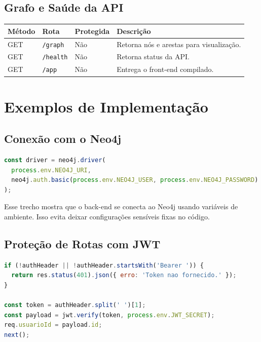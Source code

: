 \documentclass[12pt,a4paper]{article}
\begin{document}
\subsection{Grafo e Saúde da API}

\begin{table}[H]
\centering
\begin{tabular}{p{2cm}p{4.5cm}p{2cm}p{5cm}}
\toprule
\textbf{Método} & \textbf{Rota} & \textbf{Protegida} & \textbf{Descrição}\\
\midrule
GET & \texttt{/graph} & Não & Retorna nós e arestas para visualização.\\
GET & \texttt{/health} & Não & Retorna status da API.\\
GET & \texttt{/app} & Não & Entrega o front-end compilado.\\
\bottomrule
\end{tabular}
\end{table}

\section{Exemplos de Implementação}

\subsection{Conexão com o Neo4j}

\begin{lstlisting}[language=JavaScript]
const driver = neo4j.driver(
  process.env.NEO4J_URI,
  neo4j.auth.basic(process.env.NEO4J_USER, process.env.NEO4J_PASSWORD)
);
\end{lstlisting}

Esse trecho mostra que o back-end se conecta ao Neo4j usando variáveis de ambiente. Isso evita deixar configurações sensíveis fixas no código.

\subsection{Proteção de Rotas com JWT}

\begin{lstlisting}[language=JavaScript]
if (!authHeader || !authHeader.startsWith('Bearer ')) {
  return res.status(401).json({ erro: 'Token nao fornecido.' });
}

const token = authHeader.split(' ')[1];
const payload = jwt.verify(token, process.env.JWT_SECRET);
req.usuarioId = payload.id;
next();
\end{lstlisting}
\end{document}
